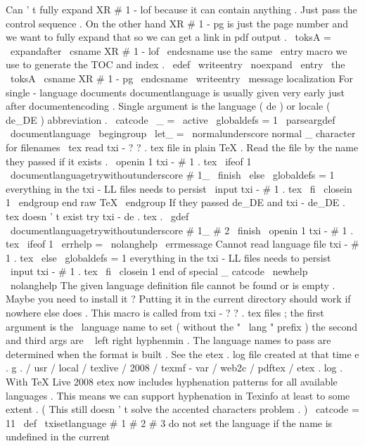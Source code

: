 {{{{{
{
%
%
Can
'
t
fully
expand
XR
#
1
-
lof
because
it
can
contain
anything
.
Just
%
pass
the
control
sequence
.
On
the
other
hand
XR
#
1
-
pg
is
just
the
%
page
number
and
we
want
to
fully
expand
that
so
we
can
get
a
link
%
in
pdf
output
.
\
toksA
=
\
expandafter
{
\
csname
XR
#
1
-
lof
\
endcsname
}
%
%
%
use
the
same
\
entry
macro
we
use
to
generate
the
TOC
and
index
.
\
edef
\
writeentry
{
\
noexpand
\
entry
{
\
the
\
toksA
}
{
\
csname
XR
#
1
-
pg
\
endcsname
}
}
%
\
writeentry
}
}
\
message
{
localization
}
%
For
single
-
language
documents
documentlanguage
is
usually
given
very
%
early
just
after
documentencoding
.
Single
argument
is
the
language
%
(
de
)
or
locale
(
de_DE
)
abbreviation
.
%
{
\
catcode
\
_
=
\
active
\
globaldefs
=
1
\
parseargdef
\
documentlanguage
{
\
begingroup
\
let_
=
\
normalunderscore
%
normal
_
character
for
filenames
\
tex
%
read
txi
-
?
?
.
tex
file
in
plain
TeX
.
%
Read
the
file
by
the
name
they
passed
if
it
exists
.
\
openin
1
txi
-
#
1
.
tex
\
ifeof
1
\
documentlanguagetrywithoutunderscore
{
#
1_
\
finish
}
%
\
else
\
globaldefs
=
1
%
everything
in
the
txi
-
LL
files
needs
to
persist
\
input
txi
-
#
1
.
tex
\
fi
\
closein
1
\
endgroup
%
end
raw
TeX
\
endgroup
}
%
%
If
they
passed
de_DE
and
txi
-
de_DE
.
tex
doesn
'
t
exist
%
try
txi
-
de
.
tex
.
%
\
gdef
\
documentlanguagetrywithoutunderscore
#
1_
#
2
\
finish
{
%
\
openin
1
txi
-
#
1
.
tex
\
ifeof
1
\
errhelp
=
\
nolanghelp
\
errmessage
{
Cannot
read
language
file
txi
-
#
1
.
tex
}
%
\
else
\
globaldefs
=
1
%
everything
in
the
txi
-
LL
files
needs
to
persist
\
input
txi
-
#
1
.
tex
\
fi
\
closein
1
}
}
%
end
of
special
_
catcode
%
\
newhelp
\
nolanghelp
{
The
given
language
definition
file
cannot
be
found
or
is
empty
.
Maybe
you
need
to
install
it
?
Putting
it
in
the
current
directory
should
work
if
nowhere
else
does
.
}
%
This
macro
is
called
from
txi
-
?
?
.
tex
files
;
the
first
argument
is
the
%
\
language
name
to
set
(
without
the
"
\
lang
"
prefix
)
the
second
and
%
third
args
are
\
{
left
right
}
hyphenmin
.
%
%
The
language
names
to
pass
are
determined
when
the
format
is
built
.
%
See
the
etex
.
log
file
created
at
that
time
e
.
g
.
%
/
usr
/
local
/
texlive
/
2008
/
texmf
-
var
/
web2c
/
pdftex
/
etex
.
log
.
%
%
With
TeX
Live
2008
etex
now
includes
hyphenation
patterns
for
all
%
available
languages
.
This
means
we
can
support
hyphenation
in
%
Texinfo
at
least
to
some
extent
.
(
This
still
doesn
'
t
solve
the
%
accented
characters
problem
.
)
%
\
catcode
=
11
\
def
\
txisetlanguage
#
1
#
2
#
3
{
%
%
do
not
set
the
language
if
the
name
is
undefined
in
the
current
}}}}}
